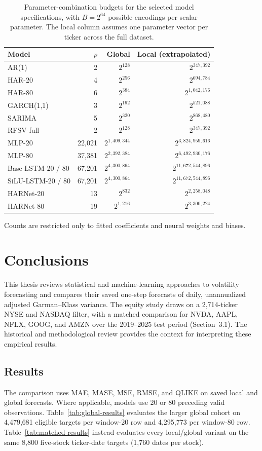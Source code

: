 \documentclass[12pt,a4paper]{article}
\numberwithin{equation}{section}
\numberwithin{table}{section}
\numberwithin{figure}{section}
\begin{document}
\begin{table}[htbp]
\centering\scriptsize\setlength{\tabcolsep}{3pt}
\begin{tabular}{lrrr}\hline
Model & $p$ & Global & Local (extrapolated)\\\hline
AR(1) & 2 & $2^{128}$ & $2^{347,392}$\\
HAR-20 & 4 & $2^{256}$ & $2^{694,784}$\\
HAR-80 & 6 & $2^{384}$ & $2^{1,042,176}$\\
GARCH(1,1) & 3 & $2^{192}$ & $2^{521,088}$\\
SARIMA & 5 & $2^{320}$ & $2^{868,480}$\\
RFSV-full & 2 & $2^{128}$ & $2^{347,392}$\\
MLP-20 & 22,021 & $2^{1,409,344}$ & $2^{3,824,959,616}$\\
MLP-80 & 37,381 & $2^{2,392,384}$ & $2^{6,492,930,176}$\\
Base LSTM-20 / 80 & 67,201 & $2^{4,300,864}$ & $2^{11,672,544,896}$\\
SiLU-LSTM-20 / 80 & 67,201 & $2^{4,300,864}$ & $2^{11,672,544,896}$\\
HARNet-20 & 13 & $2^{832}$ & $2^{2,258,048}$\\
HARNet-80 & 19 & $2^{1,216}$ & $2^{3,300,224}$\\\hline
\end{tabular}
\caption{Parameter-combination budgets for the selected model specifications, with $B = 2^{64}$ possible encodings per scalar parameter. The local column assumes one parameter vector per ticker across the full dataset.}\label{tab:parameter-combinations}
\end{table}
\FloatBarrier

Counts are restricted only to fitted coefficients and neural weights and biases.

\section{Conclusions}
This thesis reviews statistical and machine-learning approaches to volatility forecasting and compares their saved one-step forecasts of daily, unannualized adjusted Garman--Klass variance. The equity study draws on a 2,714-ticker NYSE and NASDAQ filter, with a matched comparison for NVDA, AAPL, NFLX, GOOG, and AMZN over the 2019--2025 test period (Section~3.1). The historical and methodological review provides the context for interpreting these empirical results.

\subsection{Results}
The comparison uses MAE, MASE, MSE, RMSE, and QLIKE on saved local and global forecasts. Where applicable, models use 20 or 80 preceding valid observations. Table~\ref{tab:global-results} evaluates the larger global cohort on 4,479,681 eligible targets per window-20 row and 4,295,773 per window-80 row. Table~\ref{tab:matched-results} instead evaluates every local/global variant on the same 8,800 five-stock ticker-date targets (1,760 dates per stock). 
\end{document}
